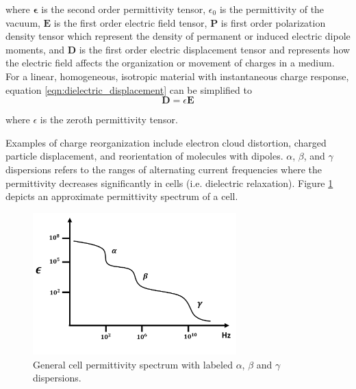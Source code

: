  \noindent where $\boldsymbol{\epsilon}$ is the second order permittivity tensor, $\epsilon_0$ is the permittivity of the vacuum, $\textbf{E}$ is the first order electric field tensor, $\textbf{P}$ is first order polarization density tensor which represent the density of permanent or induced electric dipole moments, and $\textbf{D}$ is the first order electric displacement tensor and represents how the electric field affects the organization or movement of charges in a medium. For a linear, homogeneous, isotropic material with instantaneous charge response, equation \ref{eqn:dielectric_displacement} can be simplified to
 \begin{equation}
    \textbf{D} = \epsilon \textbf{E}
 \end{equation}
 
 \noindent where $\epsilon$ is the zeroth permittivity tensor. 
 
 \par Examples of charge reorganization include electron cloud distortion, charged particle displacement, and reorientation of molecules with dipoles. $\alpha$, $\beta$, and $\gamma$ dispersions refers to the ranges of alternating current frequencies where the permittivity decreases significantly in cells (i.e. dielectric relaxation). Figure \ref{fig:schwan_dispersions} depicts an approximate permittivity spectrum of a cell.
 
 \begin{figure}[ht]
 \centering
 \includegraphics[width=0.7\textwidth]{images/schwanDispersions.png}
 \caption[General cell permittivity spectrum]{General cell permittivity spectrum with labeled $\alpha$, $\beta$ and $\gamma$ dispersions.}
 \label{fig:schwan_dispersions}
 \end{figure}
 
